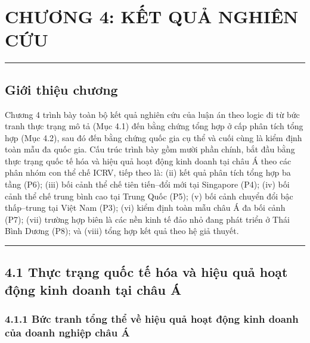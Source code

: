 \documentclass[
  a4paper,
  13pt]{extreport}
\author{}
\date{}
\begin{document}
\hypertarget{chux1b0ux1a1ng-4-kux1ebft-quux1ea3-nghiuxean-cux1ee9u}{%
\chapter{CHƯƠNG 4: KẾT QUẢ NGHIÊN
CỨU}\label{chux1b0ux1a1ng-4-kux1ebft-quux1ea3-nghiuxean-cux1ee9u}}

\begin{center}\rule{0.5\linewidth}{0.5pt}\end{center}

\hypertarget{giux1edbi-thiux1ec7u-chux1b0ux1a1ng}{%
\section{Giới thiệu chương}\label{giux1edbi-thiux1ec7u-chux1b0ux1a1ng}}

Chương 4 trình bày toàn bộ kết quả nghiên cứu của luận án theo logic đi
từ bức tranh thực trạng mô tả (Mục 4.1) đến bằng chứng tổng hợp ở cấp
phân tích tổng hợp (Mục 4.2), sau đó đến bằng chứng quốc gia cụ thể và
cuối cùng là kiểm định toàn mẫu đa quốc gia. Cấu trúc trình bày gồm mười
phần chính, bắt đầu bằng thực trạng quốc tế hóa và hiệu quả hoạt động
kinh doanh tại châu Á theo các phân nhóm con thể chế ICRV, tiếp theo là:
(ii) kết quả phân tích tổng hợp ba tầng (P6); (iii) bối cảnh thể chế
tiên tiến--đổi mới tại Singapore (P4); (iv) bối cảnh thể chế trung bình
cao tại Trung Quốc (P5); (v) bối cảnh chuyển đổi bậc thấp--trung tại
Việt Nam (P3); (vi) kiểm định toàn mẫu châu Á đa bối cảnh (P7); (vii)
trường hợp biên là các nền kinh tế đảo nhỏ đang phát triển ở Thái Bình
Dương (P8); và (viii) tổng hợp kết quả theo hệ giả thuyết.

\begin{center}\rule{0.5\linewidth}{0.5pt}\end{center}

\hypertarget{thux1ef1c-trux1ea1ng-quux1ed1c-tux1ebf-huxf3a-vuxe0-hiux1ec7u-quux1ea3-houx1ea1t-ux111ux1ed9ng-kinh-doanh-tux1ea1i-chuxe2u-uxe1}{%
\section{4.1 Thực trạng quốc tế hóa và hiệu quả hoạt động kinh doanh tại
châu
Á}\label{thux1ef1c-trux1ea1ng-quux1ed1c-tux1ebf-huxf3a-vuxe0-hiux1ec7u-quux1ea3-houx1ea1t-ux111ux1ed9ng-kinh-doanh-tux1ea1i-chuxe2u-uxe1}}

\hypertarget{bux1ee9c-tranh-tux1ed5ng-thux1ec3-vux1ec1-hiux1ec7u-quux1ea3-houx1ea1t-ux111ux1ed9ng-kinh-doanh-cux1ee7a-doanh-nghiux1ec7p-chuxe2u-uxe1}{%
\subsection{4.1.1 Bức tranh tổng thể về hiệu quả hoạt động kinh doanh
của doanh nghiệp châu
Á}\label{bux1ee9c-tranh-tux1ed5ng-thux1ec3-vux1ec1-hiux1ec7u-quux1ea3-houx1ea1t-ux111ux1ed9ng-kinh-doanh-cux1ee7a-doanh-nghiux1ec7p-chuxe2u-uxe1}}
\end{document}
